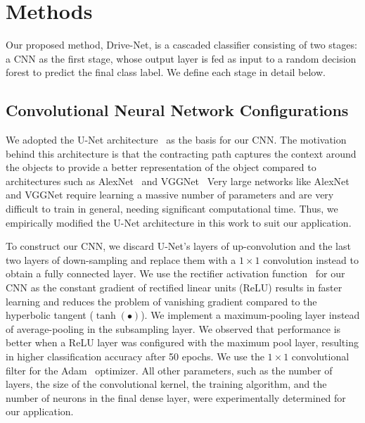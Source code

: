 \section{Methods}
Our proposed method, Drive-Net, is a cascaded classifier consisting of two stages: a CNN as the first stage, whose output layer is fed as input to a random decision forest to predict the final class label. We define each stage in detail below.


\subsection{Convolutional Neural Network Configurations}
We adopted the U-Net architecture~\cite{ronneberger_UNet_2015} as the basis for our CNN\@. The motivation behind this architecture is that the contracting path captures the context around the objects to provide a better representation of the object compared to architectures such as AlexNet~\cite{krizhevsky_One_2014} and VGGNet~\cite{simonyan_Very_2014} Very large networks like AlexNet and VGGNet require learning a massive number of parameters and are very difficult to train in general, needing significant computational time. Thus, we empirically modified the U-Net architecture in this work to suit our application.

To construct our CNN, we discard U-Net's layers of up-convolution and the last two layers of down-sampling and replace them with a $1\times1 $ convolution instead to obtain a fully connected layer. We use the rectifier activation function~\cite{simonyan_Very_2014} for our CNN as the constant gradient of rectified linear units (ReLU) results in faster learning and reduces the problem of vanishing gradient compared to the hyperbolic tangent (${\tanh{(\bullet)}} $). We implement a maximum-pooling layer instead of average-pooling in the subsampling layer. We observed that performance is better when a ReLU layer was configured with the maximum pool layer, resulting in higher classification accuracy after 50 epochs. We use the $1\times1 $ convolutional filter for the Adam~\cite{kingma_Adam_2014} optimizer. All other parameters, such as the number of layers, the size of the convolutional kernel, the training algorithm, and the number of neurons in the final dense layer, were experimentally determined for our application.

